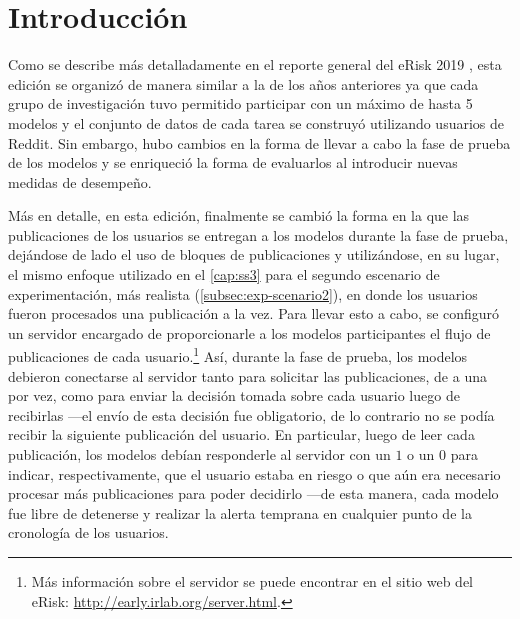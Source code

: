 



\section{Introducción}

Como se describe más detalladamente en el reporte general del eRisk 2019 \cite{losadaetal2019}, esta edición se organizó de manera similar a la de los años anteriores ya que cada grupo de investigación tuvo permitido participar con un máximo de hasta 5 modelos y el conjunto de datos de cada tarea se construyó utilizando usuarios de Reddit.
Sin embargo, hubo cambios en la forma de llevar a cabo la fase de prueba de los modelos y se enriqueció la forma de evaluarlos al introducir nuevas medidas de desempeño.

Más en detalle, en esta edición, finalmente se cambió la forma en la que las publicaciones de los usuarios se entregan a los modelos durante la fase de prueba, dejándose de lado el uso de bloques de publicaciones y utilizándose, en su lugar, el mismo enfoque utilizado en el \autoref{cap:ss3} para el segundo escenario de experimentación, más realista (\autoref{subsec:exp-scenario2}), en donde los usuarios fueron procesados una publicación a la vez.
Para llevar esto a cabo, se configuró un servidor encargado de proporcionarle a los modelos participantes el flujo de publicaciones de cada usuario.\footnote{Más información sobre el servidor se puede encontrar en el sitio web del eRisk: \url{http://early.irlab.org/server.html}.}
Así, durante la fase de prueba, los modelos debieron conectarse al servidor tanto para solicitar las publicaciones, de a una por vez, como para enviar la decisión tomada sobre cada usuario luego de recibirlas ---el envío de esta decisión fue obligatorio, de lo contrario no se podía recibir la siguiente publicación del usuario. En particular, luego de leer cada publicación, los modelos debían responderle al servidor con un $1$ o un $0$ para indicar, respectivamente, que el usuario estaba en riesgo o que aún era necesario procesar más publicaciones para poder decidirlo ---de esta manera, cada modelo fue libre de detenerse y realizar la alerta temprana en cualquier punto de la cronología de los usuarios.

